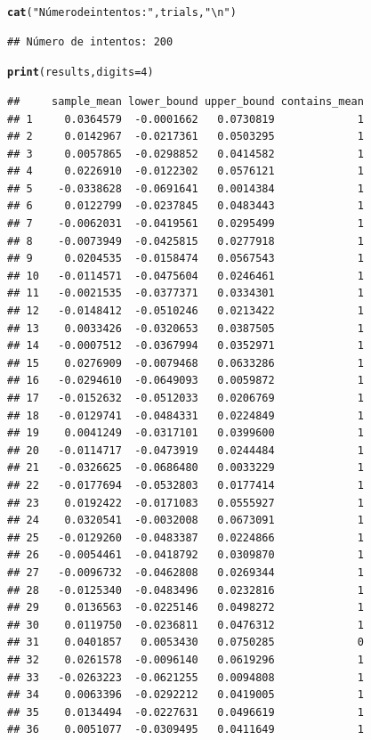 \documentclass[12pt]{article}\usepackage[]{graphicx}\usepackage[]{xcolor}
\makeatletter
\newcommand{\hlnum}[1]{\textcolor[rgb]{0.686,0.059,0.569}{#1}}%
\newcommand{\hlsng}[1]{\textcolor[rgb]{0.192,0.494,0.8}{#1}}%
\newcommand{\hldef}[1]{\textcolor[rgb]{0.345,0.345,0.345}{#1}}%
\newcommand{\hlkwc}[1]{\textcolor[rgb]{0.333,0.667,0.333}{#1}}%
\newcommand{\hlkwd}[1]{\textcolor[rgb]{0.737,0.353,0.396}{\textbf{#1}}}%
\newenvironment{kframe}{%
 \def\at@end@of@kframe{}%
 \ifinner\ifhmode%
  \def\at@end@of@kframe{\end{minipage}}%
  \begin{minipage}{\columnwidth}%
 \fi\fi%
 \def\FrameCommand##1{\hskip\@totalleftmargin \hskip-\fboxsep
 \colorbox{shadecolor}{##1}\hskip-\fboxsep
     \hskip-\linewidth \hskip-\@totalleftmargin \hskip\columnwidth}%
 \MakeFramed {\advance\hsize-\width
   \@totalleftmargin\z@ \linewidth\hsize
   \@setminipage}}%
 {\par\unskip\endMakeFramed%
 \at@end@of@kframe}
\newenvironment{knitrout}{}{} %
\makeatother
\begin{document}
\begin{knitrout}
\begin{kframe}
\begin{alltt}
\hlkwd{cat}\hldef{(}\hlsng{"Número de intentos:"}\hldef{, trials,} \hlsng{"\textbackslash{}n"}\hldef{)}
\end{alltt}
\begin{verbatim}
## Número de intentos: 200
\end{verbatim}
\begin{alltt}
\hlkwd{print}\hldef{(results,} \hlkwc{digits}\hldef{=} \hlnum{4}\hldef{)}
\end{alltt}
\begin{verbatim}
##     sample_mean lower_bound upper_bound contains_mean
## 1     0.0364579  -0.0001662   0.0730819             1
## 2     0.0142967  -0.0217361   0.0503295             1
## 3     0.0057865  -0.0298852   0.0414582             1
## 4     0.0226910  -0.0122302   0.0576121             1
## 5    -0.0338628  -0.0691641   0.0014384             1
## 6     0.0122799  -0.0237845   0.0483443             1
## 7    -0.0062031  -0.0419561   0.0295499             1
## 8    -0.0073949  -0.0425815   0.0277918             1
## 9     0.0204535  -0.0158474   0.0567543             1
## 10   -0.0114571  -0.0475604   0.0246461             1
## 11   -0.0021535  -0.0377371   0.0334301             1
## 12   -0.0148412  -0.0510246   0.0213422             1
## 13    0.0033426  -0.0320653   0.0387505             1
## 14   -0.0007512  -0.0367994   0.0352971             1
## 15    0.0276909  -0.0079468   0.0633286             1
## 16   -0.0294610  -0.0649093   0.0059872             1
## 17   -0.0152632  -0.0512033   0.0206769             1
## 18   -0.0129741  -0.0484331   0.0224849             1
## 19    0.0041249  -0.0317101   0.0399600             1
## 20   -0.0114717  -0.0473919   0.0244484             1
## 21   -0.0326625  -0.0686480   0.0033229             1
## 22   -0.0177694  -0.0532803   0.0177414             1
## 23    0.0192422  -0.0171083   0.0555927             1
## 24    0.0320541  -0.0032008   0.0673091             1
## 25   -0.0129260  -0.0483387   0.0224866             1
## 26   -0.0054461  -0.0418792   0.0309870             1
## 27   -0.0096732  -0.0462808   0.0269344             1
## 28   -0.0125340  -0.0483496   0.0232816             1
## 29    0.0136563  -0.0225146   0.0498272             1
## 30    0.0119750  -0.0236811   0.0476312             1
## 31    0.0401857   0.0053430   0.0750285             0
## 32    0.0261578  -0.0096140   0.0619296             1
## 33   -0.0263223  -0.0621255   0.0094808             1
## 34    0.0063396  -0.0292212   0.0419005             1
## 35    0.0134494  -0.0227631   0.0496619             1
## 36    0.0051077  -0.0309495   0.0411649             1

\end{verbatim}
\end{kframe}
\end{knitrout}
\end{document}
